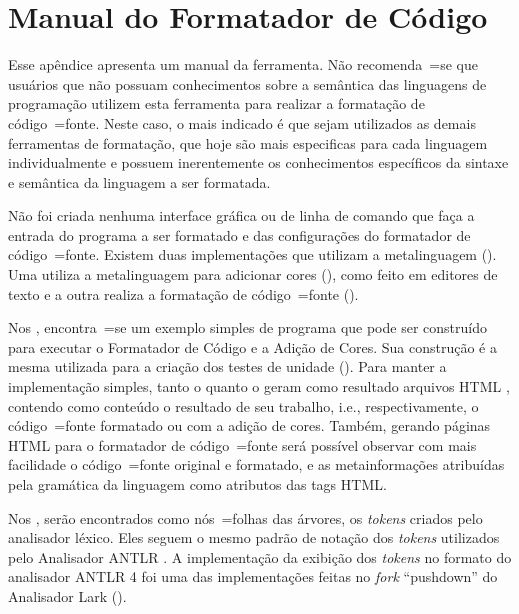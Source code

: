 

\chapter[Manual do Formatador]{Manual do Formatador de Código}
\label{chapter:manualDoFormatadorDeCodigo}

Esse apêndice apresenta um manual da ferramenta.
Não recomenda~=se que usuários que não possuam conhecimentos sobre a semântica das linguagens de programação\advisor{}{,
} utilizem esta ferramenta para realizar a formatação de código~=fonte.
Neste caso,
o mais indicado é que sejam utilizados as demais ferramentas de formatação,
que hoje são mais especificas para cada linguagem individualmente e
possuem inerentemente os conhecimentos específicos da sintaxe e
semântica da linguagem a ser formatada.

Não foi criada nenhuma interface gráfica ou
de linha de comando que faça a entrada do programa a ser formatado e
das configurações do formatador de código~=fonte.
Existem duas implementações que utilizam a metalinguagem ().
Uma utiliza a metalinguagem para adicionar cores (),
como feito em editores de texto e
a outra realiza a formatação de código~=fonte ().

Nos ,
encontra~=se um exemplo simples de programa que pode ser construído para executar o Formatador de Código e
a Adição de Cores.
Sua construção é a mesma utilizada para a criação dos testes de unidade ().
Para manter a implementação simples,
tanto o  quanto o  geram como resultado arquivos HTML \cite{parallelParserForHTML},
contendo como conteúdo o resultado de seu trabalho,
i.e., respectivamente,
o código~=fonte formatado ou
com a adição de cores.
Também,
gerando páginas HTML para o formatador de código~=fonte será possível observar com mais facilidade o código~=fonte original e
formatado,
e as metainformações atribuídas pela gramática da linguagem como atributos das tags HTML.

Nos ,
serão encontrados como nós~=folhas das árvores,
os \textit{tokens} criados pelo analisador léxico.
Eles seguem o mesmo padrão de notação dos \textit{tokens} utilizados pelo Analisador ANTLR \cite{antlrBookTerrentParr}.
A implementação da exibição dos \textit{tokens} no formato do analisador ANTLR 4 foi uma das implementações feitas no \textit{fork} ``pushdown'' do Analisador Lark ().

